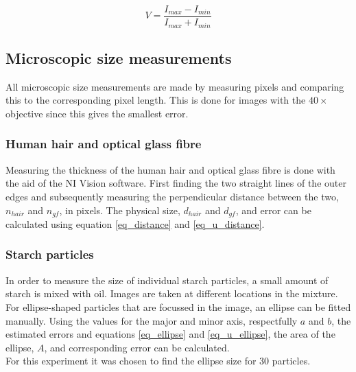 \begin{equation}
  V = \frac{I_{max}-I_{min}}{I_{max}+I_{min}}
  \label{eq:visibility}
\end{equation}
\subsection{Microscopic size measurements}
All microscopic size measurements are made by measuring pixels and comparing this to the corresponding pixel length. This is done for images with the $40\times$ objective since this gives the smallest error.

\subsubsection*{Human hair and optical glass fibre}
Measuring the thickness of the human hair and optical glass fibre is done with the aid of the NI Vision software. First finding the two straight lines of the outer edges and subsequently measuring the perpendicular distance between the two, $n_{hair}$ and $n_{gf}$, in pixels. The physical size, $d_{hair}$ and $d_{gf}$, and error can be calculated using equation \ref{eq_distance} and \ref{eq_u_distance}.


\subsubsection*{Starch particles}
In order to measure the size of individual starch particles, a small amount of starch is mixed with oil. Images are taken at different locations in the mixture. For ellipse-shaped particles that are focussed in the image, an ellipse can be fitted manually. Using the values for the major and minor axis, respectfully $a$ and $b$, the estimated errors and equations \ref{eq_ellipse} and \ref{eq_u_ellipse}, the area of the ellipse, $A$, and corresponding error can be calculated.\\
For this experiment it was chosen to find the ellipse size for 30 particles.


